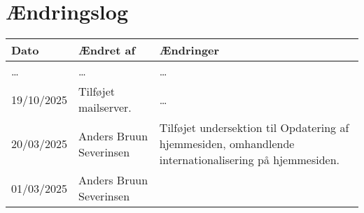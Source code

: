 \section{Ændringslog}
\label{sec:changelog}

\begin{tabular}{l l l}
    \textbf{Dato} & \textbf{Ændret af} & \textbf{Ændringer} \\
    \hline
    \begin{minipage}[t]
        {0.15\linewidth}
        \dots
    \end{minipage} &
    \begin{minipage}[t]
        {0.35\linewidth}
        \dots
    \end{minipage} & 
    \begin{minipage}[t]
        {0.5\linewidth}
        \dots
    \end{minipage} \\
    \hline
    \begin{minipage}[t]
        {0.15\linewidth}
        19/10/2025
    \end{minipage} &
    \begin{minipage}[t]
        {0.35\linewidth}
        Tilføjet mailserver.
    \end{minipage} & 
    \begin{minipage}[t]
        {0.5\linewidth}
        \dots
    \end{minipage} \\
    \hline
    \begin{minipage}[t]
        {0.15\linewidth}
        20/03/2025
    \end{minipage} &
    \begin{minipage}[t]
        {0.35\linewidth}
        Anders Bruun Severinsen
    \end{minipage} & 
    \begin{minipage}[t]
        {0.5\linewidth}
        Tilføjet undersektion til Opdatering af hjemmesiden, omhandlende 
        internationalisering på hjemmesiden.
    \end{minipage} \\
    \hline
    \begin{minipage}[t]
        {0.15\linewidth}
        01/03/2025
    \end{minipage} &
    \begin{minipage}[t]
        {0.35\linewidth}
        Anders Bruun Severinsen
    \end{minipage} & 
    \begin{minipage}[t]

\end{minipage}
\end{tabular}
